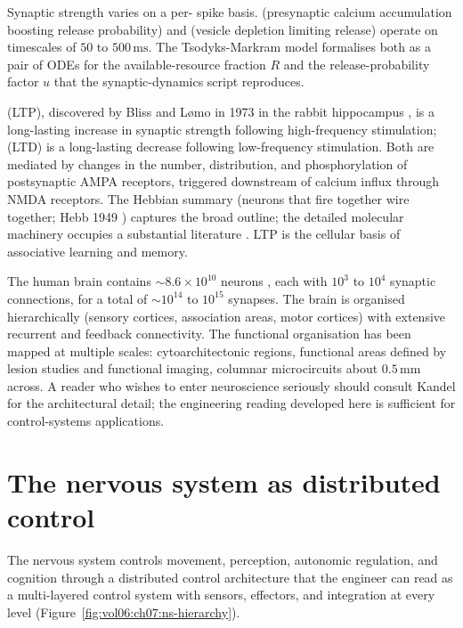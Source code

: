 Synaptic strength varies on a per-
spike basis.  (presynaptic calcium accumulation
boosting release probability) and  (vesicle
depletion limiting release) operate on timescales of $50$ to
$500\,\text{ms}$. The Tsodyks-Markram model
\cite{paper:v6c07-tsodyks-markram-1997} formalises both as a pair of
ODEs for the available-resource fraction $R$ and the
release-probability factor $u$ that the synaptic-dynamics script
reproduces.

  (LTP),
discovered by Bliss and L\o mo in 1973 in the rabbit hippocampus
\cite{paper:v6c07-bliss-lomo-1973}, is a long-lasting increase in
synaptic strength following high-frequency stimulation;
 (LTD) is a long-lasting decrease
following low-frequency stimulation. Both are mediated by changes in
the number, distribution, and phosphorylation of postsynaptic AMPA
receptors, triggered downstream of calcium influx through NMDA
receptors. The Hebbian summary (neurons that fire together wire
together; Hebb 1949 \cite{text:v6c07-hebb-1949}) captures the broad
outline; the detailed molecular machinery occupies a substantial
literature \cite[chs.~66--67]{text:v6c07-kandel-principles-2021}. LTP
is the cellular basis of associative learning and memory.

 The human brain contains $\sim 8.6 \times 10^{10}$
neurons \cite[ch.~1]{text:v6c07-kandel-principles-2021}, each with
$10^3$ to $10^4$ synaptic connections, for a total of $\sim 10^{14}$
to $10^{15}$ synapses. The brain is organised hierarchically (sensory
cortices, association areas, motor cortices) with extensive recurrent
and feedback connectivity. The functional organisation has been mapped
at multiple scales: cytoarchitectonic regions, functional areas
defined by lesion studies and functional imaging, columnar
microcircuits about $0.5\,\text{mm}$ across. A reader who wishes to
enter neuroscience seriously should consult Kandel
\cite{text:v6c07-kandel-principles-2021} for the architectural
detail; the engineering reading developed here is sufficient for
control-systems applications.

\section{The nervous system as distributed control}

The nervous system controls movement, perception, autonomic
regulation, and cognition through a distributed control architecture
that the engineer can read as a multi-layered control system with
sensors, effectors, and integration at every level
(Figure~\ref{fig:vol06:ch07:ns-hierarchy}).


